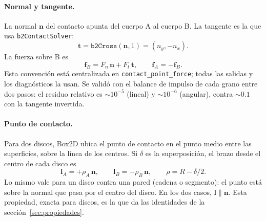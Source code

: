 \documentclass[11pt,a4paper]{article}
\newcommand{\vect}[1]{\mathbf{#1}}
\newcommand{\n}{\vect{n}}
\newcommand{\tv}{\vect{t}}
\newcommand{\lv}{\vect{l}}
\newcommand{\f}{\vect{f}}
\newcommand{\code}[1]{\texttt{#1}}
\begin{document}
\paragraph{Normal y tangente.} La normal $\n$ del contacto apunta del
cuerpo A al cuerpo B. La tangente es la que usa \code{b2ContactSolver}:
\begin{equation}
  \tv = \code{b2Cross}(\n, 1) = (n_y, -n_x).
\end{equation}
La fuerza sobre B es
\begin{equation}
  \f_B = F_n \, \n + F_t \, \tv , \qquad \f_A = -\f_B .
  \label{eq:fuerza}
\end{equation}
Esta convención está centralizada en \code{contact\_point\_force}; todas
las salidas y los diagnósticos la usan. Se validó con el balance de
impulso de cada grano entre dos pasos: el residuo relativo es $\sim
10^{-5}$ (lineal) y $\sim 10^{-6}$ (angular), contra $\sim 0.1$ con la
tangente invertida.

\paragraph{Punto de contacto.} Para dos discos, Box2D ubica el punto de
contacto en el punto medio entre las superficies, sobre la línea de los
centros. Si $\delta$ es la superposición, el brazo desde el centro de cada
disco es
\begin{equation}
  \lv_A = +\rho_A \, \n, \qquad \lv_B = -\rho_B \, \n, \qquad
  \rho = R - \delta/2 .
  \label{eq:brazo}
\end{equation}
Lo mismo vale para un disco contra una pared (cadena o segmento): el punto
está sobre la normal que pasa por el centro del disco. En los dos casos,
$\lv \parallel \n$. Esta propiedad, exacta para discos, es la que da las
identidades de la sección~\ref{sec:propiedades}.

\begin{center}
\end{center}
\end{document}
